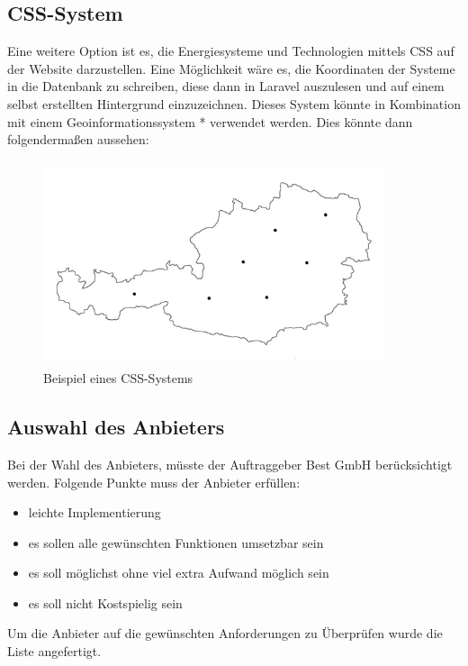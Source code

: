 \subsection{CSS-System}
Eine weitere Option ist es, die Energiesysteme und Technologien mittels CSS auf der Website darzustellen. Eine Möglichkeit wäre es, die Koordinaten der Systeme in die Datenbank zu schreiben, diese dann in Laravel auszulesen und auf einem selbst erstellten Hintergrund  einzuzeichnen. Dieses System könnte in Kombination mit einem Geoinformationssystem * verwendet werden. Dies könnte dann folgendermaßen aussehen: 

\begin{figure}[h]
	\centering
	\includegraphics[height=6cm,width=10cm]{images/CSS_System}
	\caption{Beispiel eines CSS-Systems}
	\label{fig:CSS_System}
\end{figure}

\newpage
\subsection{Auswahl des Anbieters}
	Bei der Wahl des Anbieters, müsste der Auftraggeber Best GmbH berücksichtigt werden. Folgende Punkte muss der Anbieter erfüllen:
	\begin{itemize}
		\item leichte Implementierung 
		\item es sollen alle gewünschten Funktionen umsetzbar sein 
		\item es soll möglichst ohne viel extra Aufwand möglich sein  
		\item es soll nicht Kostspielig sein 
	\end{itemize}

Um die Anbieter auf die gewünschten Anforderungen zu Überprüfen wurde die Liste angefertigt.

